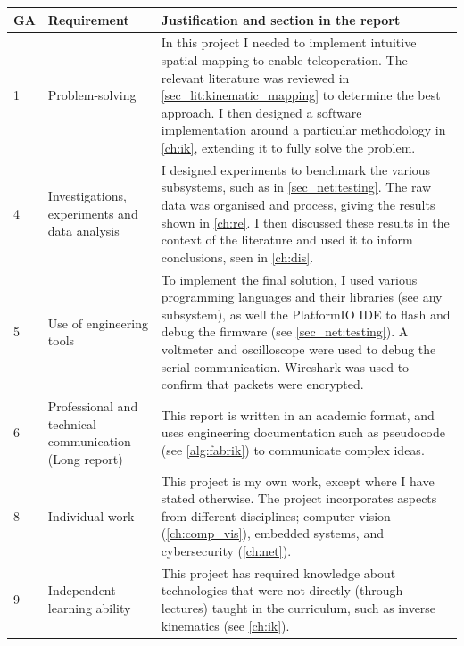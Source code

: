 \begin{table}[h!]
\centering
\begin{tabular}{||p{2em} |p{12em} |p{23em}||}
    \hline
    \textbf{GA} & \textbf{Requirement} & \textbf{Justification and section in the report}  \\ [0.5ex] 
    \hline\hline
    1 & Problem-solving & In this project I needed to implement intuitive spatial mapping to enable teleoperation. The relevant literature was reviewed in \autoref{sec_lit:kinematic_mapping} to determine the best approach. I then designed a software implementation around a particular methodology in \autoref{ch:ik}, extending it to fully solve the problem. \\ 
    \hline
    4 & Investigations, experiments and data analysis & I designed experiments to benchmark the various subsystems, such as in \autoref{sec_net:testing}. The raw data was organised and process, giving the results shown in \autoref{ch:re}. I then discussed these results in the context of the literature and used it to inform conclusions, seen in \autoref{ch:dis}. \\
    \hline
    5 & Use of engineering tools & To implement the final solution, I used various programming languages and their libraries (see any subsystem), as well the PlatformIO IDE to flash and debug the firmware (see \autoref{sec_net:testing}). A voltmeter and oscilloscope were used to debug the serial communication. Wireshark was used to confirm that packets were encrypted. \\
    \hline
    6 & Professional and technical communication (Long report) & This report is written in an academic format, and uses engineering documentation such as pseudocode (see \autoref{alg:fabrik}) to communicate complex ideas. \\
    \hline
    8 & Individual work & This project is my own work, except where I have stated otherwise. The project incorporates aspects from different disciplines; computer vision (\autoref{ch:comp_vis}), embedded systems, and cybersecurity (\autoref{ch:net}). \\
    \hline
    9 & Independent learning ability & This project has required knowledge about technologies that were not directly (through lectures) taught in the curriculum, such as inverse kinematics (see \autoref{ch:ik}). \\ [1ex]
    \hline
\end{tabular}
\end{table}
